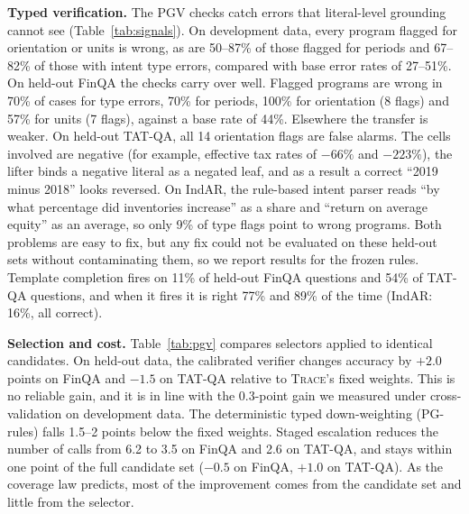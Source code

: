 \documentclass[conference]{IEEEtran}
\newcommand{\ours}{\textsc{Trace-PG}}
\newcommand{\trace}{\textsc{Trace}}
\begin{document}
\textbf{Typed verification.} The PGV checks catch errors that literal-level grounding cannot see (Table~\ref{tab:signals}). On development data, every program flagged for orientation or units is wrong, as are 50--87\% of those flagged for periods and 67--82\% of those with intent type errors, compared with base error rates of 27--51\%. On held-out FinQA the checks carry over well. Flagged programs are wrong in 70\% of cases for type errors, 70\% for periods, 100\% for orientation (8 flags) and 57\% for units (7 flags), against a base rate of 44\%. Elsewhere the transfer is weaker. On held-out TAT-QA, all 14 orientation flags are false alarms. The cells involved are negative (for example, effective tax rates of $-66\%$ and $-223\%$), the lifter binds a negative literal as a negated leaf, and as a result a correct ``2019 minus 2018'' looks reversed. On IndAR, the rule-based intent parser reads ``by what percentage did inventories increase'' as a share and ``return on average equity'' as an average, so only 9\% of type flags point to wrong programs. Both problems are easy to fix, but any fix could not be evaluated on these held-out sets without contaminating them, so we report results for the frozen rules. Template completion fires on 11\% of held-out FinQA questions and 54\% of TAT-QA questions, and when it fires it is right 77\% and 89\% of the time (IndAR: 16\%, all correct).

\begin{table}[t]
\centering
\caption{Selection methods over the same candidates. PG-rules: deterministic typed down-weighting; \ours{}: calibrated verifier; PG-esc.: staged escalation.}
\label{tab:pgv}
\footnotesize
\setlength{\tabcolsep}{2.5pt}

\end{table}

\textbf{Selection and cost.} Table~\ref{tab:pgv} compares selectors applied to identical candidates. On held-out data, the calibrated verifier changes accuracy by $+2.0$ points on FinQA and $-1.5$ on TAT-QA relative to \trace{}'s fixed weights. This is no reliable gain, and it is in line with the 0.3-point gain we measured under cross-validation on development data. The deterministic typed down-weighting (PG-rules) falls 1.5--2 points below the fixed weights. Staged escalation reduces the number of calls from 6.2 to 3.5 on FinQA and 2.6 on TAT-QA, and stays within one point of the full candidate set ($-0.5$ on FinQA, $+1.0$ on TAT-QA). As the coverage law predicts, most of the improvement comes from the candidate set and little from the selector.
\end{document}
